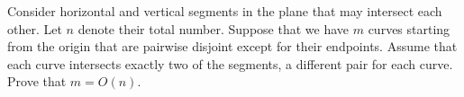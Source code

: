 Consider horizontal and vertical segments in the plane that may intersect each other. Let $n$ denote their total number. Suppose that we have $m$ curves starting from the origin that are pairwise disjoint except for their endpoints. Assume that each curve intersects exactly two of the segments, a different pair for each curve. Prove that $m=O(n)$.
